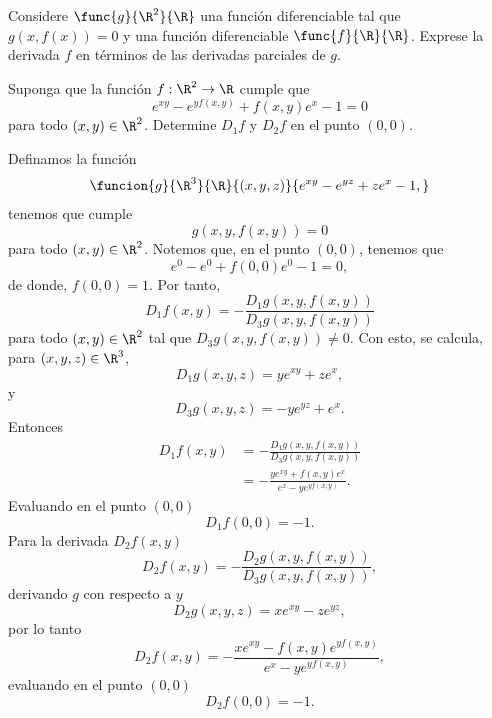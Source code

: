 \documentclass[a4,11pt]{aleph-examen}
\begin{document}
\begin{preguntas}
\begin{respuesta}
\begin{respuesta}
\item
	Considere $\func{g}{\R^2}{\R}$ una función diferenciable tal que $g(x,f(x))=0$ y una función diferenciable $\func{f}{\R}{\R}$. Exprese la derivada $f$ en términos de las derivadas parciales de $g$.
        

\item
    Suponga que la función $f:\R^2 \rightarrow \R$ cumple que
    \[
        e^{xy}-e^{yf(x,y)}+f(x,y)e^x-1=0
    \]
    para todo $(x,y)\in \R^2$. Determine $D_1f$ y $D_2f$ en el punto $(0,0)$.
    
\begin{respuesta} 
    Definamos la función
    \[
        \funcion{g}{\R^3}{\R}{(x,y,z)}{e^{xy}-e^{yz}+ze^x-1,}
    \]
    tenemos que cumple
    \[
        g(x,y,f(x,y))=0
    \]
	para todo $(x,y)\in \R^2$. Notemos que, en el punto $(0,0)$, tenemos que
	\[
	    e^{0}-e^{0}+f(0,0)e^0-1=0,
    \]	
    de donde, $f(0,0)=1$. Por tanto,
	\[
        D_1f(x,y)=-\frac{D_1g(x,y,f(x,y))}{D_3g(x,y,f(x,y))}	
    \]
	para todo $(x,y)\in \R^2$ tal que $D_3g(x,y,f(x,y))\neq 0$. Con esto,  se calcula, para $(x,y,z)\in \R^3$,
	\[
        D_1g(x,y,z)=ye^{xy}+ze^x,
	\]
	y
	\[
	    D_3g(x,y,z)=-ye^{yz}+e^x.
	\]      
	Entonces 
	\begin{align*}
	    D_1f(x,y)
	    & =-\frac{D_1g(x,y,f(x,y))}{D_3g(x,y,f(x,y))}\\
		& =-\frac{ye^{xy}+f(x,y)e^x}{e^x-ye^{yf(x,y)}}.
	\end{align*}
	Evaluando en el punto $(0,0)$
	\[
        D_1f(0,0)=-1.
    \]
	Para la derivada $D_2f(x,y)$
	\[
	    D_2f(x,y)=-\frac{D_2g(x,y,f(x,y))}{D_3g(x,y,f(x,y))},
    \]
	derivando $g$ con respecto a $y$
	\[
        D_2g(x,y,z)=xe^{xy}-ze^{yz},
    \]
	por lo tanto 
	\[
        D_2f(x,y)=-\frac{xe^{xy}-f(x,y)e^{yf(x,y)}}{e^x-ye^{yf(x,y)}},
    \]
	evaluando en el punto $(0,0)$
	\[
        D_2f(0,0)=-1.
    \]
\end{respuesta}


\end{respuesta}
\end{respuesta}
\end{preguntas}
\end{document}
